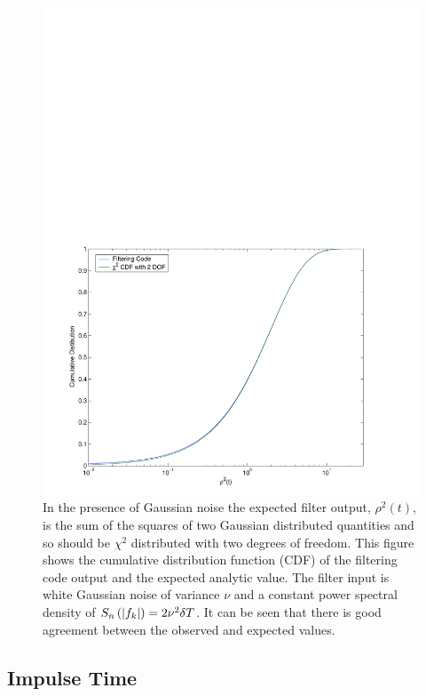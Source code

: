 \begin{figure}[htb]
\label{f:rhosq_gaussian_cdf}
\begin{center}
\includegraphics[width=\linewidth]{figures/findchirp/rhosq_gaussian_cdf}
\end{center}
\caption{%
In the presence of Gaussian noise the expected filter output, $\rho^2(t)$, is
the sum of the squares of two Gaussian distributed quantities and so should be
$\chi^2$ distributed with two degrees of freedom. This figure shows the
cumulative distribution function (CDF) of the filtering code output and the
expected analytic value. The filter input is white Gaussian noise of variance
$\nu$ and a constant power spectral density of $S_n\left(\left|f_{k}\right|\right) = 2\nu^2\delta T$. It
can be seen that there is good agreement between the observed and expected
values.
}
\end{figure}

\subsection{Impulse Time}
\label{ss:impulsetime}

